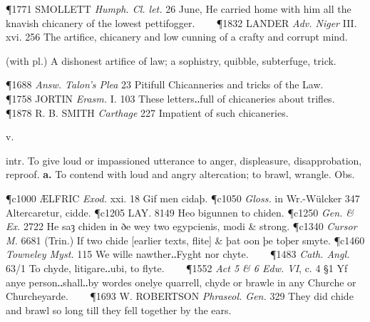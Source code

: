 \begin{description}[wide, labelwidth=!, labelindent=0pt]
\begin{myenumerate}
\P 1771 SMOLLETT  \textit{Humph. Cl. let.} 26 June, He carried home with him all the knavish chicanery of the lowest pettifogger.    
\P 1832 LANDER  \textit{Adv. Niger} III. xvi. 256 The artifice, chicanery and low cunning of a crafty and corrupt mind.

 (with pl.) A dishonest artifice of law; a sophistry, quibble, subterfuge, trick.

\P 1688  \textit{Answ. Talon's Plea} 23 Pitifull Chicanneries and tricks of the Law.    
\P 1758 JORTIN  \textit{Erasm.} I. 103 These letters‥full of chicaneries about trifles.    
\P 1878 R. B. SMITH  \textit{Carthage} 227 Impatient of such chicaneries.
\end{myenumerate}


 v.

\noindent {}

\vspace{-0.3cm}

\begin{myenumerate}

 intr. To give loud or impassioned utterance to anger, displeasure,
disapprobation, reproof. \textbf{a.} To contend with loud and angry altercation; to brawl, wrangle. Obs.

\P c1000 ÆLFRIC  \textit{Exod.} xxi. 18 Gif men cidaþ.
\P c1050 \textit{Gloss.} in Wr.-Wülcker 347 Altercaretur, cidde.
\P c1205 LAY.  8149 Heo bigunnen to chiden.
\P c1250 \textit{Gen. \& Ex.}  2722 He saȝ chiden in ðe wey two egypcienis, modi \& strong.
\P c1340  \textit{Cursor M.} 6681 (Trin.) If two chide [earlier texts, flite] \& þat oon þe toþer smyte.
\P c1460 \textit{Towneley  Myst.} 115 We wille nawther‥Fyght nor chyte.    
\P 1483 \textit{Cath.  Angl.} 63/1 To chyde, litigare‥ubi, to flyte.    
\P 1552 \textit{Act  5 \& 6 Edw. VI}, c. 4 §1 Yf anye person‥shall‥by wordes onelye quarrell, chyde or brawle in any Churche or Churcheyarde.    
\P 1693 W. ROBERTSON  \textit{Phraseol. Gen.} 329 They did chide and brawl so long till they fell together by the ears.


\end{myenumerate}
\end{description}
